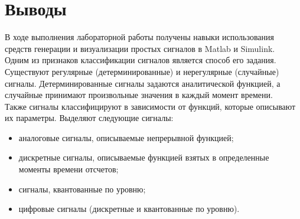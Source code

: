 \documentclass[a4paper]{article}
\begin{document}
\newpage


\flushleft \section{Выводы}
В ходе выполнения лабораторной работы получены навыки использования средств генерации и визуализации простых сигналов в Matlab и Simulink.\\

Одним из признаков классификации сигналов является способ его задания. Существуют регулярные (детерминированные) и нерегулярные (случайные) сигналы. Детерминированные сигналы задаются аналитической функцией, а случайные принимают произвольные значения в каждый момент времени.\\

Также сигналы классифицируют в зависимости от функций, которые описывают их параметры. Выделяют следующие сигналы:
\begin{itemize}
	\item аналоговые сигналы, описываемые непрерывной функцией;
	\item дискретные сигналы, описываемые функцией взятых в определенные моменты времени отсчетов;
	\item сигналы, квантованные по уровню;
	\item цифровые сигналы (дискретные и квантованные по уровню).
\end{itemize}
\end{document}
